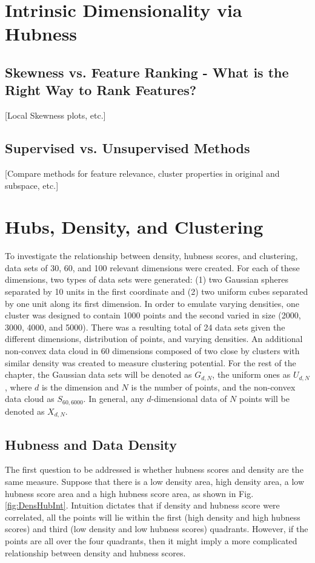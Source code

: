 \documentclass[graybox]{svmult}
\begin{document}
\section{Intrinsic Dimensionality via Hubness}
\label{sec:3}

\subsection{Skewness vs. Feature Ranking - What is the Right Way to Rank Features? }
\label{subsec:3.1}
[Local Skewness plots, etc.]

\subsection{Supervised vs. Unsupervised Methods }
\label{subsec:3.2}
[Compare methods for feature relevance, cluster properties in original and subspace, etc.]


\section{Hubs, Density, and Clustering}
\label{sec:4}

To investigate the relationship between density, hubness scores, and clustering, data sets of 30, 60, and 100 relevant dimensions were created. For each of these dimensions, two types of data sets were generated: (1) two Gaussian spheres separated by 10 units in the first coordinate and (2) two uniform cubes separated by one unit along its first dimension. In order to emulate varying densities, one cluster was designed to contain 1000 points and the second varied in size (2000, 3000, 4000, and 5000). There was a resulting total of 24 data sets given the different dimensions, distribution of points, and varying densities. An additional non-convex data cloud in 60 dimensions composed of two close by clusters with similar density was created to measure clustering potential. For the rest of the chapter, the Gaussian data sets will be denoted as $G_{d,N}$, the uniform ones as $U_{d,N}$, where $d$ is the dimension and $N$ is the number of points, and the non-convex data cloud as $S_{60,6000}$. In general, any $d$-dimensional data of $N$ points will be denoted as $X_{d,N}$.


\subsection{Hubness and Data Density}
\label{density}

The first question to be addressed is whether hubness scores and density are the same measure. Suppose that there is a low density area, high density area, a low hubness score area and a high hubness score area, as shown in Fig. \ref{fig:DensHubInt}. Intuition dictates that if density and hubness score were correlated, all the points will lie within the first (high density and high hubness scores) and third (low density and low hubness scores) quadrants. However, if the points are all over the four quadrants, then it might imply a more complicated relationship between density and hubness scores. 
\end{document}

